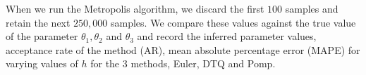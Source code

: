 \documentclass[graybox]{svmult}
\begin{document}
When we run the Metropolis algorithm, we discard the first $100$ samples and retain the next $250,000$ samples. We compare these values against the true value of the parameter $\theta_1, \theta_2$ and $\theta_3$ and record the inferred parameter values, acceptance rate of the method (AR), mean absolute percentage error (MAPE) for varying values of $h$ for the 3 methods, Euler, DTQ and Pomp.
\vspace{-4mm}
\end{document}
